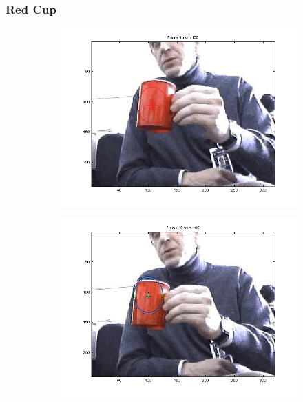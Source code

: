 \documentclass[hyperref={pdfpagelabels=false}]{beamer}
\begin{document}
\begin{frame}
\frametitle{Red Cup}
\begin{figure}
         \centering
         \begin{subfigure}[b]{0.3\textwidth}
                 \includegraphics[width=\textwidth]{results/redcup/Frame0001.png}
         \end{subfigure}%
         \begin{subfigure}[b]{0.3\textwidth}
                 \includegraphics[width=\textwidth]{results/redcup/Frame0010.png}
         \end{subfigure}
         \begin{subfigure}[b]{0.3\textwidth}

\end{subfigure}
\end{figure}
\end{frame}
\end{document}
